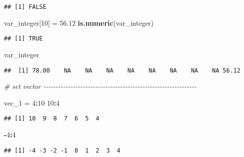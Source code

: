 \documentclass[
]{article}
\newenvironment{Shaded}{\begin{snugshade}}{\end{snugshade}}
\newcommand{\CommentTok}[1]{\textcolor[rgb]{0.56,0.35,0.01}{\textit{#1}}}
\newcommand{\DecValTok}[1]{\textcolor[rgb]{0.00,0.00,0.81}{#1}}
\newcommand{\FloatTok}[1]{\textcolor[rgb]{0.00,0.00,0.81}{#1}}
\newcommand{\FunctionTok}[1]{\textcolor[rgb]{0.13,0.29,0.53}{\textbf{#1}}}
\newcommand{\NormalTok}[1]{#1}
\newcommand{\OtherTok}[1]{\textcolor[rgb]{0.56,0.35,0.01}{#1}}
\newcommand{\SpecialCharTok}[1]{\textcolor[rgb]{0.81,0.36,0.00}{\textbf{#1}}}
\begin{document}
\begin{verbatim}
## [1] FALSE
\end{verbatim}

\begin{Shaded}
\begin{Highlighting}[]
\NormalTok{var\_integer[}\DecValTok{10}\NormalTok{] }\OtherTok{=} \FloatTok{56.12} 
\FunctionTok{is.numeric}\NormalTok{(var\_integer)}
\end{Highlighting}
\end{Shaded}

\begin{verbatim}
## [1] TRUE
\end{verbatim}

\begin{Shaded}
\begin{Highlighting}[]
\NormalTok{var\_integer}
\end{Highlighting}
\end{Shaded}

\begin{verbatim}
##  [1] 78.00    NA    NA    NA    NA    NA    NA    NA    NA 56.12
\end{verbatim}

\begin{Shaded}
\begin{Highlighting}[]
\CommentTok{\# set vector {-}{-}{-}{-}{-}{-}{-}{-}{-}{-}{-}{-}{-}{-}{-}{-}{-}{-}{-}{-}{-}{-}{-}{-}{-}{-}{-}{-}{-}{-}{-}{-}{-}{-}{-}{-}{-}{-}{-}{-}{-}{-}{-}{-}{-}{-}{-}{-}{-}{-}{-}{-}{-}{-}{-}{-}{-}{-}{-}{-}{-}{-}}

\NormalTok{vec\_1 }\OtherTok{=} \DecValTok{4}\SpecialCharTok{:}\DecValTok{10}
\DecValTok{10}\SpecialCharTok{:}\DecValTok{4}
\end{Highlighting}
\end{Shaded}

\begin{verbatim}
## [1] 10  9  8  7  6  5  4
\end{verbatim}

\begin{Shaded}
\begin{Highlighting}[]
\SpecialCharTok{{-}}\DecValTok{4}\SpecialCharTok{:}\DecValTok{4}
\end{Highlighting}
\end{Shaded}

\begin{verbatim}
## [1] -4 -3 -2 -1  0  1  2  3  4
\end{verbatim}
\end{document}
